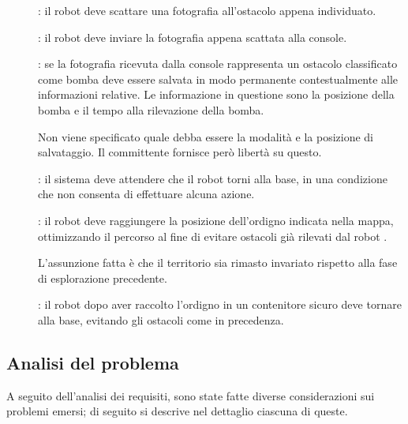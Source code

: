 \begin{description}
  \item[]:
    il robot deve scattare una fotografia all'ostacolo appena individuato.

  \item[]:
    il robot deve inviare la fotografia appena scattata alla console.

  \item[]:
    se la fotografia ricevuta dalla console rappresenta un ostacolo classificato come bomba deve essere salvata
    in modo permanente contestualmente alle informazioni relative.
    Le informazione in questione sono la posizione della bomba e il tempo alla rilevazione della bomba.

    Non viene specificato quale debba essere la modalità e la posizione di salvataggio.
    Il committente fornisce però libertà su questo.

  \item[]:
    il sistema deve attendere che il robot  torni alla base, in una condizione che non consenta di effettuare alcuna azione.

  \item[]:
    il robot  deve raggiungere la posizione dell'ordigno indicata nella mappa,
    ottimizzando il percorso al fine di evitare ostacoli già rilevati dal robot .

    L'assunzione fatta è che il territorio sia rimasto invariato rispetto alla fase di esplorazione precedente.

  \item[]:
    il robot  dopo aver raccolto l’ordigno in un contenitore sicuro deve tornare alla base,
    evitando gli ostacoli come in precedenza.

\end{description}

\subsection{Analisi del problema}

A seguito dell'analisi dei requisiti, sono state fatte diverse considerazioni sui problemi emersi;
di seguito si descrive nel dettaglio ciascuna di queste.

